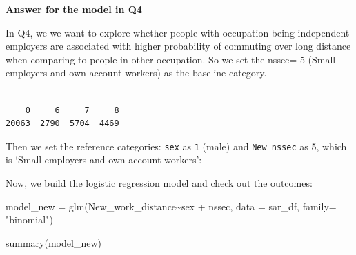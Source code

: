 \documentclass[
  letterpaper,
  DIV=11,
  numbers=noendperiod]{scrreprt}
\newenvironment{Shaded}{\begin{snugshade}}{\end{snugshade}}
\newcommand{\AttributeTok}[1]{\textcolor[rgb]{0.40,0.45,0.13}{#1}}
\newcommand{\FunctionTok}[1]{\textcolor[rgb]{0.28,0.35,0.67}{#1}}
\newcommand{\NormalTok}[1]{\textcolor[rgb]{0.00,0.23,0.31}{#1}}
\newcommand{\OtherTok}[1]{\textcolor[rgb]{0.00,0.23,0.31}{#1}}
\newcommand{\SpecialCharTok}[1]{\textcolor[rgb]{0.37,0.37,0.37}{#1}}
\newcommand{\StringTok}[1]{\textcolor[rgb]{0.13,0.47,0.30}{#1}}
\begin{document}
\textbf{Answer for the model in Q4}

In Q4, we we want to explore whether people with occupation being
independent employers are associated with higher probability of
commuting over long distance when comparing to people in other
occupation. So we set the nssec= 5 (Small employers and own account
workers) as the baseline category.

\begin{Shaded}
\end{Shaded}

\begin{verbatim}

    0     6     7     8 
20063  2790  5704  4469 
\end{verbatim}

Then we set the reference categories: \texttt{sex} as \texttt{1} (male)
and \texttt{New\_nssec} as 5, which is `Small employers and own account
workers':

\begin{Shaded}
\end{Shaded}

Now, we build the logistic regression model and check out the outcomes:

\begin{Shaded}
\begin{Highlighting}[]
\NormalTok{model\_new }\OtherTok{=} \FunctionTok{glm}\NormalTok{(New\_work\_distance}\SpecialCharTok{\textasciitilde{}}\NormalTok{sex }\SpecialCharTok{+}\NormalTok{ nssec, }\AttributeTok{data =}\NormalTok{ sar\_df, }\AttributeTok{family=} \StringTok{"binomial"}\NormalTok{)}

\FunctionTok{summary}\NormalTok{(model\_new)}
\end{Highlighting}
\end{Shaded}
\end{document}
